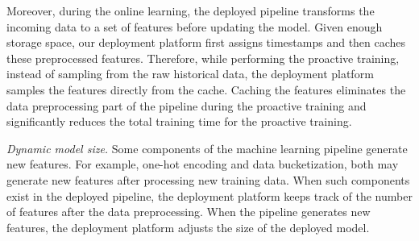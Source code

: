 Moreover, during the online learning, the deployed pipeline transforms the incoming data to a set of features before updating the model.
Given enough storage space, our deployment platform first assigns timestamps and then caches these preprocessed features.
Therefore, while performing the proactive training, instead of sampling from the raw historical data, the deployment platform samples the features directly from the cache.
Caching the features eliminates the data preprocessing part of the pipeline during the proactive training and significantly reduces the total training time for the proactive training.

\textit{Dynamic model size.}
Some components of the machine learning pipeline generate new features.
For example, one-hot encoding and data bucketization, both may generate new features after processing new training data.
When such components exist in the deployed pipeline, the deployment platform keeps track of the number of features after the data preprocessing.
When the pipeline generates new features, the deployment platform adjusts the size of the deployed model.

